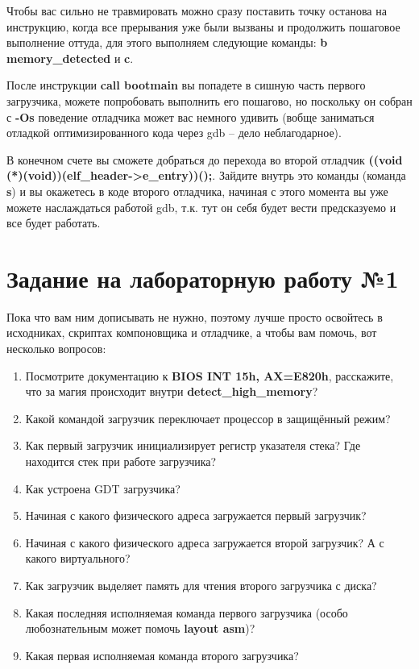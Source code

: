 Чтобы вас сильно не травмировать можно сразу поставить точку останова на
инструкцию, когда все прерывания уже были вызваны и продолжить пошаговое
выполнение оттуда, для этого выполняем следующие команды: \textbf{b memory\_detected} и \textbf{c}.

После инструкции \textbf{call bootmain} вы попадете в сишную часть первого
загрузчика, можете попробовать выполнить его пошагово, но поскольку он собран
с \textbf{-Os} поведение отладчика может вас немного удивить (вобще заниматься
отладкой оптимизированного кода через gdb -- дело неблагодарное).

В конечном счете вы сможете добраться до перехода во второй отладчик \textbf{((void (*)(void))(elf\_header->e\_entry))();}.
Зайдите внутрь это команды (команда \textbf{s}) и вы окажетесь в коде второго
отладчика, начиная с этого момента вы уже можете наслаждаться работой gdb,
т.к. тут он себя будет вести предсказуемо и все будет работать.

\section{Задание на лабораторную работу №1}
Пока что вам ним дописывать не нужно, поэтому лучше просто освойтесь в
исходниках, скриптах компоновщика и отладчике, а чтобы вам помочь, вот
несколько вопросов:

\begin{enumerate}
\item Посмотрите документацию к \textbf{BIOS INT 15h, AX=E820h}, расскажите,
	что за магия происходит внутри \textbf{detect\_high\_memory}?
\item Какой командой загрузчик переключает процессор в защищённый режим?
\item Как первый загрузчик инициализирует регистр указателя стека? Где находится стек при работе загрузчика?
\item Как устроена GDT загрузчика?
\item Начиная с какого физического адреса загружается первый загрузчик?
\item Начиная с какого физического адреса загружается второй загрузчик? А с какого виртуального?
\item Как загрузчик выделяет память для чтения второго загрузчика с диска?
\item Какая последняя исполняемая команда первого загрузчика (особо любознательным может помочь \textbf{layout asm})?
\item Какая первая исполняемая команда второго загрузчика?
\end{enumerate}
